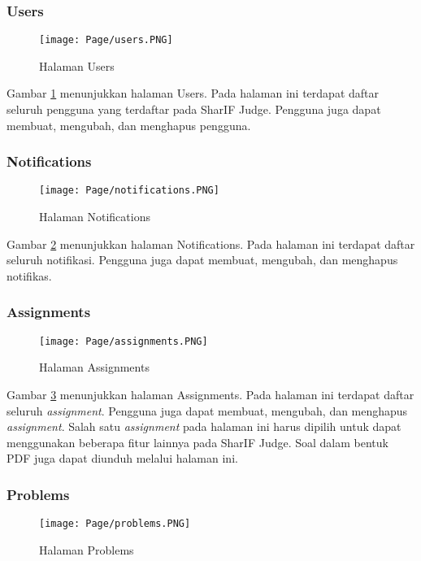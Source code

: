 \subsubsection{Users}
    \begin{figure}[H]
    	\centering  
    	\texttt{[image: Page/users.PNG]}  
    	\caption{Halaman Users}
    	\label{fig:3:users} 
    \end{figure} 
    
    Gambar \ref{fig:3:users} menunjukkan halaman Users. Pada halaman ini terdapat daftar seluruh pengguna yang terdaftar pada SharIF Judge. Pengguna juga dapat membuat, mengubah, dan menghapus pengguna.
    
\subsubsection{Notifications}
    \begin{figure}[H]
    	\centering  
    	\texttt{[image: Page/notifications.PNG]}  
    	\caption{Halaman Notifications}
    	\label{fig:3:notifications} 
    \end{figure} 
    
    Gambar \ref{fig:3:notifications} menunjukkan halaman Notifications. Pada halaman ini terdapat daftar seluruh notifikasi. Pengguna juga dapat membuat, mengubah, dan menghapus notifikas.

\subsubsection{Assignments}
    \begin{figure}[H]
    	\centering  
    	\texttt{[image: Page/assignments.PNG]}  
    	\caption{Halaman Assignments}
    	\label{fig:3:assignments} 
    \end{figure} 
    
    Gambar \ref{fig:3:assignments} menunjukkan halaman Assignments. Pada halaman ini terdapat daftar seluruh \textit{assignment}. Pengguna juga dapat membuat, mengubah, dan menghapus \textit{assignment}. Salah satu \textit{assignment} pada halaman ini harus dipilih untuk dapat menggunakan beberapa fitur lainnya pada SharIF Judge. Soal dalam bentuk PDF juga dapat diunduh melalui halaman ini. 
    
\subsubsection{Problems}
    \begin{figure}[H]
    	\centering  
    	\texttt{[image: Page/problems.PNG]}  
    	\caption{Halaman Problems}
    	\label{fig:3:problems} 
    \end{figure} 
    
